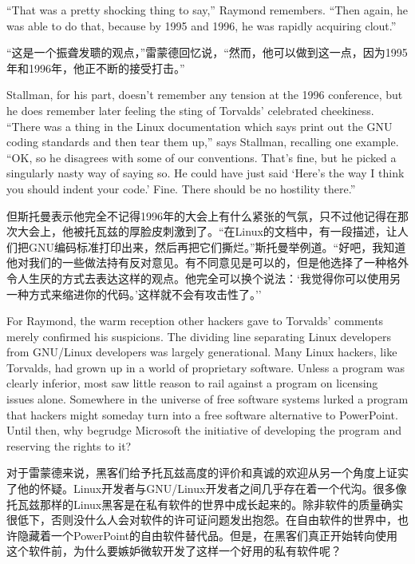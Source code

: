 \ifdefined\eng
``That was a pretty shocking thing to say,'' Raymond remembers. ``Then again, he was able to do that, because by 1995 and 1996, he was rapidly acquiring clout.''
\fi

\ifdefined\chs
``这是一个振聋发聩的观点，''雷蒙德回忆说，``然而，他可以做到这一点，因为1995年和1996年，他正不断的接受打击。''
\fi

\ifdefined\eng
Stallman, for his part, doesn't remember any tension at the 1996 conference, but he does remember later feeling the sting of Torvalds' celebrated cheekiness. ``There was a thing in the Linux documentation which says print out the GNU coding standards and then tear them up,'' says Stallman, recalling one example. ``OK, so he disagrees with some of our conventions. That's fine, but he picked a singularly nasty way of saying so. He could have just said `Here's the way I think you should indent your code.' Fine. There should be no hostility there.''
\fi

\ifdefined\chs
但斯托曼表示他完全不记得1996年的大会上有什么紧张的气氛，只不过他记得在那次大会上，他被托瓦兹的厚脸皮刺激到了。``在Linux的文档中，有一段描述，让人们把GNU编码标准打印出来，然后再把它们撕烂。''斯托曼举例道。``好吧，我知道他对我们的一些做法持有反对意见。有不同意见是可以的，但是他选择了一种格外令人生厌的方式去表达这样的观点。他完全可以换个说法：`我觉得你可以使用另一种方式来缩进你的代码。'这样就不会有攻击性了。''
\fi

\ifdefined\eng
For Raymond, the warm reception other hackers gave to Torvalds' comments merely confirmed his suspicions. The dividing line separating Linux developers from GNU/Linux developers was largely generational. Many Linux hackers, like Torvalds, had grown up in a world of proprietary software. Unless a program was clearly inferior, most saw little reason to rail against a program on licensing issues alone. Somewhere in the universe of free software systems lurked a program that hackers might someday turn into a free software alternative to PowerPoint. Until then, why begrudge Microsoft the initiative of developing the program and reserving the rights to it?
\fi

\ifdefined\chs
对于雷蒙德来说，黑客们给予托瓦兹高度的评价和真诚的欢迎从另一个角度上证实了他的怀疑。Linux开发者与GNU/Linux开发者之间几乎存在着一个代沟。很多像托瓦兹那样的Linux黑客是在私有软件的世界中成长起来的。除非软件的质量确实很低下，否则没什么人会对软件的许可证问题发出抱怨。在自由软件的世界中，也许隐藏着一个PowerPoint的自由软件替代品。但是，在黑客们真正开始转向使用这个软件前，为什么要嫉妒微软开发了这样一个好用的私有软件呢？
\fi

